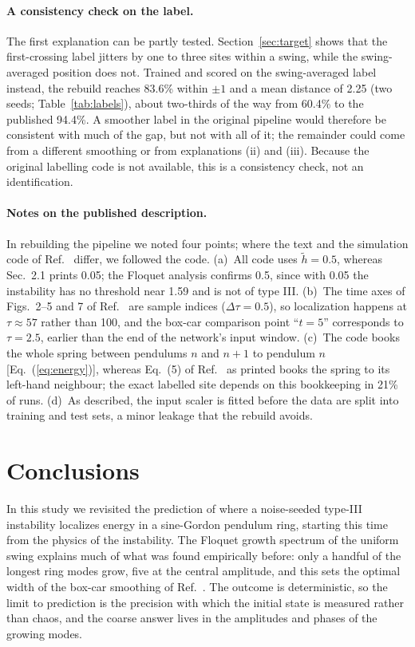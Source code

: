 \documentclass[11pt]{article}
\newcommand{\htl}{\tilde h}
\begin{document}
\paragraph{A consistency check on the label.} The first explanation can be partly tested. Section~\ref{sec:target} shows that the first-crossing label jitters by one to three sites within a swing, while the swing-averaged position does not. Trained and scored on the swing-averaged label instead, the rebuild reaches 83.6\% within $\pm1$ and a mean distance of 2.25 (two seeds; Table~\ref{tab:labels}), about two-thirds of the way from 60.4\% to the published 94.4\%. A smoother label in the original pipeline would therefore be consistent with much of the gap, but not with all of it; the remainder could come from a different smoothing or from explanations (ii) and (iii). Because the original labelling code is not available, this is a consistency check, not an identification.

\paragraph{Notes on the published description.} In rebuilding the pipeline we noted four points; where the text and the simulation code of Ref.~\cite{mittal2026jand} differ, we followed the code. (a)~All code uses $\htl=0.5$, whereas Sec.~2.1 prints 0.05; the Floquet analysis confirms 0.5, since with 0.05 the instability has no threshold near 1.59 and is not of type III. (b)~The time axes of Figs.~2--5 and 7 of Ref.~\cite{mittal2026jand} are sample indices ($\Delta\tau=0.5$), so localization happens at $\tau\approx57$ rather than 100, and the box-car comparison point ``$t=5$'' corresponds to $\tau=2.5$, earlier than the end of the network's input window. (c)~The code books the whole spring between pendulums $n$ and $n+1$ to pendulum $n$ [Eq.~(\ref{eq:energy})], whereas Eq.~(5) of Ref.~\cite{mittal2026jand} as printed books the spring to its left-hand neighbour; the exact labelled site depends on this bookkeeping in 21\% of runs. (d)~As described, the input scaler is fitted before the data are split into training and test sets, a minor leakage that the rebuild avoids.

\section{Conclusions}
\label{sec:conclusions}

In this study we revisited the prediction of where a noise-seeded type-III instability localizes energy in a sine-Gordon pendulum ring, starting this time from the physics of the instability. The Floquet growth spectrum of the uniform swing explains much of what was found empirically before: only a handful of the longest ring modes grow, five at the central amplitude, and this sets the optimal width of the box-car smoothing of Ref.~\cite{mittal2026jand}. The outcome is deterministic, so the limit to prediction is the precision with which the initial state is measured rather than chaos, and the coarse answer lives in the amplitudes and phases of the growing modes.
\end{document}
